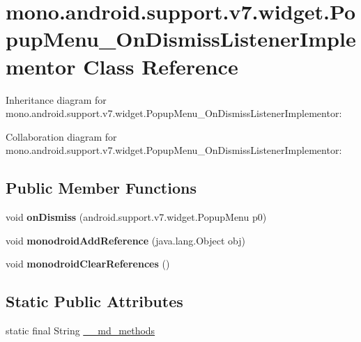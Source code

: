 \hypertarget{classmono_1_1android_1_1support_1_1v7_1_1widget_1_1_popup_menu___on_dismiss_listener_implementor}{}\section{mono.\+android.\+support.\+v7.\+widget.\+Popup\+Menu\+\_\+\+On\+Dismiss\+Listener\+Implementor Class Reference}
\label{classmono_1_1android_1_1support_1_1v7_1_1widget_1_1_popup_menu___on_dismiss_listener_implementor}


Inheritance diagram for mono.\+android.\+support.\+v7.\+widget.\+Popup\+Menu\+\_\+\+On\+Dismiss\+Listener\+Implementor\+:


Collaboration diagram for mono.\+android.\+support.\+v7.\+widget.\+Popup\+Menu\+\_\+\+On\+Dismiss\+Listener\+Implementor\+:
\subsection*{Public Member Functions}
\begin{DoxyCompactItemize}
\item 
\mbox{\label{classmono_1_1android_1_1support_1_1v7_1_1widget_1_1_popup_menu___on_dismiss_listener_implementor_a474799f83aa29d01bffdb0ba7f644163}} 
void {\bfseries on\+Dismiss} (android.\+support.\+v7.\+widget.\+Popup\+Menu p0)
\item 
\mbox{\label{classmono_1_1android_1_1support_1_1v7_1_1widget_1_1_popup_menu___on_dismiss_listener_implementor_afc755fd6a7af3fa62ab68a4c2c9f4d4c}} 
void {\bfseries monodroid\+Add\+Reference} (java.\+lang.\+Object obj)
\item 
\mbox{\label{classmono_1_1android_1_1support_1_1v7_1_1widget_1_1_popup_menu___on_dismiss_listener_implementor_ac7bbc2cdc32f800fc1ebb9767a75b29a}} 
void {\bfseries monodroid\+Clear\+References} ()
\end{DoxyCompactItemize}
\subsection*{Static Public Attributes}
\begin{DoxyCompactItemize}
\item 
static final String \hyperlink{classmono_1_1android_1_1support_1_1v7_1_1widget_1_1_popup_menu___on_dismiss_listener_implementor_acfbe85e634b5066ac1cdc76d4d5a81c5}{\+\_\+\+\_\+md\+\_\+methods}
\end{DoxyCompactItemize}


